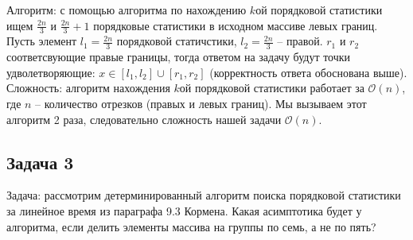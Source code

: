 \documentclass[a4paper,12pt]{article} %
\begin{document}
Алгоритм: с помощью алгоритма по нахождению $ k $ой порядковой статистики ищем $ \frac{2n}{3} $ и $ \frac{2n}{3}+1 $ порядковые статистики в исходном массиве левых границ. Пусть элемент $ l_1 = \frac{2n}{3} $ порядковой статичстики, $ l_2 = \frac{2n}{3} $ -- правой. $ r_1 $ и $ r_2 $ соответсвующие правые границы, тогда ответом на задачу будут точки удволетворяющие:  $ x \in\left[l_{1}, l_{2}\right] \cup\left[r_{1}, r_{2}\right] $ (корректность ответа обоснована выше).\\

Сложность: алгоритм нахождения $ k $ой порядковой статистики работает за $ \mathcal{O}(n) $, где $ n $ -- количество отрезков (правых и левых границ). Мы вызываем этот алгоритм 2 раза, следовательно сложность нашей задачи $ \mathcal{O}(n)  $.



\subsection*{Задача 3}
Задача: рассмотрим детерминированный алгоритм поиска порядковой статистики за линейное время из параграфа 9.3 Кормена. Какая асимптотика будет у алгоритма, если делить элементы массива на группы по семь, а не по пять?\\
\end{document}

